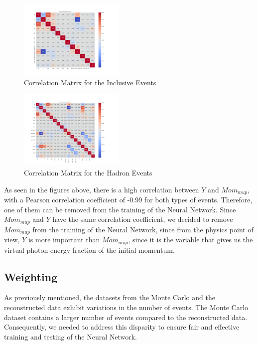 \documentclass[EPJ,twocolumn]{webofc}
\begin{document}
\begin{figure}[H]
    \centering
    \includegraphics[width=0.45\textwidth]{graphs/inclusive_correlation_matrix.png}
    \caption{Correlation Matrix for the Inclusive Events}
    \label{fig:inclusive_correlation_matrix}
\end{figure}

\begin{figure}[H]
    \centering
    \includegraphics[width=0.45\textwidth]{graphs/hadron_correlation_matrix.png}
    \caption{Correlation Matrix for the Hadron Events}
    \label{fig:hadron_correlation_matrix}
\end{figure}


As seen in the figures above, there is a high correlation between $Y$ and $Mom_{mup}$, with
a Pearson correlation coefficient of -0.99 for both types of events. Therefore, one of them can be removed from the training
of the Neural Network. Since $Mom_{mup}$ and $Y$ have the same correlation coefficient, we decided to remove $Mom_{mup}$ from the training of the Neural Network,
since from the physics point of view, $Y$ is more important than $Mom_{mup}$, since it is the variable that gives us the virtual photon energy fraction of the initial momentum. 

\subsection{Weighting}
As previously mentioned, the datasets from the Monte Carlo and the reconstructed data exhibit variations in the number of events. The Monte Carlo dataset contains a larger number of events compared to the reconstructed data. Consequently, we needed to address this disparity to ensure fair and effective training and testing of the Neural Network.
\end{document}
